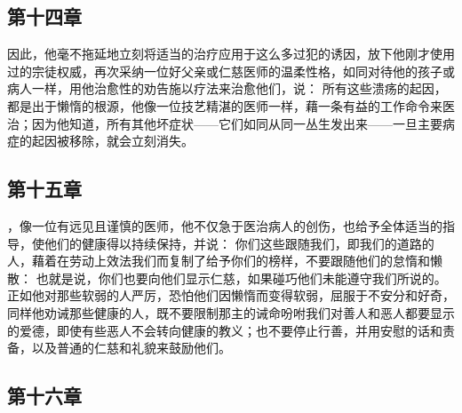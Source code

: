 
\subsection{第十四章}

\par

因此，他毫不拖延地立刻将适当的治疗应用于这么多过犯的诱因，放下他刚才使用过的宗徒权威，再次采纳一位好父亲或仁慈医师的温柔性格，如同对待他的孩子或病人一样，用他治愈性的劝告施以疗法来治愈他们，说： 所有这些溃疡的起因，都是出于懒惰的根源，他像一位技艺精湛的医师一样，藉一条有益的工作命令来医治；因为他知道，所有其他坏症状——它们如同从同一丛生发出来——一旦主要病症的起因被移除，就会立刻消失。\par


\subsection{第十五章}

\par

，像一位有远见且谨慎的医师，他不仅急于医治病人的创伤，也给予全体适当的指导，使他们的健康得以持续保持，并说： 你们这些跟随我们，即我们的道路的人，藉着在劳动上效法我们而复制了给予你们的榜样，不要跟随他们的怠惰和懒散： 也就是说，你们也要向他们显示仁慈，如果碰巧他们未能遵守我们所说的。正如他对那些软弱的人严厉，恐怕他们因懒惰而变得软弱，屈服于不安分和好奇，同样他劝诫那些健康的人，既不要限制那主的诫命吩咐我们对善人和恶人都要显示的爱德，即使有些恶人不会转向健康的教义；也不要停止行善，并用安慰的话和责备，以及普通的仁慈和礼貌来鼓励他们。\par


\subsection{第十六章}

\par

